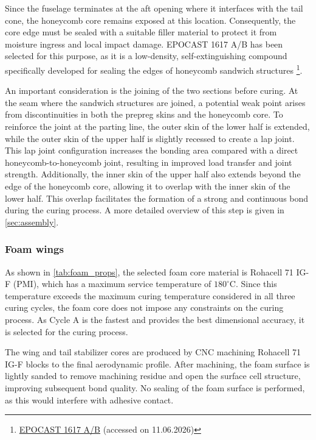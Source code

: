 Since the fuselage terminates at the aft opening where it interfaces with the tail cone, the honeycomb core remains exposed at this location. Consequently, the core edge must be sealed with a suitable filler material to protect it from moisture ingress and local impact damage. EPOCAST 1617 A/B has been selected for this purpose, as it is a low-density, self-extinguishing compound specifically developed for sealing the edges of honeycomb sandwich structures \footnote{\href{https://products.huntsman.com/products/epocast-1617-a-b-ixgqyzlv}{EPOCAST 1617 A/B} (accessed on 11.06.2026)}.

An important consideration is the joining of the two sections before curing. At the seam where the sandwich structures are joined, a potential weak point arises from discontinuities in both the prepreg skins and the honeycomb core. To reinforce the joint at the parting line, the outer skin of the lower half is extended, while the outer skin of the upper half is slightly recessed to create a lap joint. This lap joint configuration increases the bonding area compared with a direct honeycomb-to-honeycomb joint, resulting in improved load transfer and joint strength. Additionally, the inner skin of the upper half also extends beyond the edge of the honeycomb core, allowing it to overlap with the inner skin of the lower half. This overlap facilitates the formation of a strong and continuous bond during the curing process. A more detailed overview of this step is given in \autoref{sec:assembly}.

\subsubsection{\textbf{Foam wings}}
As shown in \autoref{tab:foam_props}, the selected foam core material is Rohacell 71 IG-F (PMI), which has a maximum service temperature of $180^\circ$C. Since this temperature exceeds the maximum curing temperature considered in all three curing cycles, the foam core does not impose any constraints on the curing process. As Cycle A is the fastest and provides the best dimensional accuracy, it is selected for the curing process.

The wing and tail stabilizer cores are produced by CNC machining Rohacell 71 IG-F blocks to the final aerodynamic profile. After machining, the foam surface is lightly sanded to remove machining residue and open the surface cell structure, improving subsequent bond quality. No sealing of the foam surface is performed, as this would interfere with adhesive contact.


